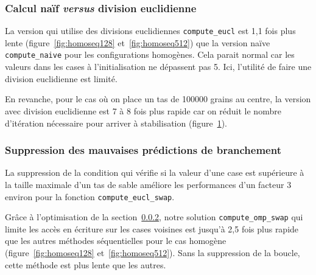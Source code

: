 \begin{figure}[!ht]
  \caption{}
  \label{fig:tourseq}
\end{figure}

\subsubsection{Calcul naïf \textit{versus} division euclidienne}

La version qui utilise des divisions euclidiennes
\texttt{compute\_eucl} est 1,1 fois plus lente
(figure~\ref{fig:homoseq128} et~\ref{fig:homoseq512}) que la version
naïve \texttt{compute\_naive} pour les configurations homogènes. Cela
parait normal car les valeurs dans les cases à l'initialisation ne
dépassent pas 5. Ici, l'utilité de faire une division euclidienne est
limité.
\medskip

En revanche, pour le cas où on place un tas de 100000 grains au
centre, la version avec division euclidienne est 7 à 8 fois plus
rapide car on réduit le nombre d'itération nécessaire pour arriver à
stabilisation (figure~\ref{fig:tourseq}).

\subsubsection{Suppression des mauvaises prédictions de branchement}
\label{sec:predict}

La suppression de la condition qui vérifie si la valeur d'une case est
supérieure à la taille maximale d'un tas de sable améliore les
performances d'un facteur 3 environ pour la fonction
\texttt{compute\_eucl\_swap}.
\medskip

Grâce à l'optimisation de la section~\ref{sec:predict}, notre solution
\texttt{compute\_omp\_swap} qui limite les accès en écriture sur les
cases voisines est jusqu'à 2,5 fois plus rapide que les autres
méthodes séquentielles pour le cas homogène
(figure~\ref{fig:homoseq128} et~\ref{fig:homoseq512}). Sans la
suppression de la boucle, cette méthode est plus lente que les autres.

